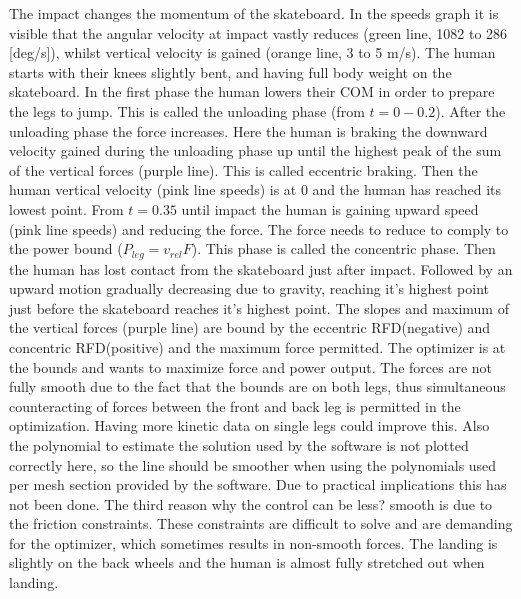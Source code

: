 \documentclass[default,iicol]{sn-jnl}
\begin{document}
{The impact changes the momentum of the skateboard. In the speeds graph it is visible that the angular velocity at impact vastly reduces (green line, 1082 to 286 [deg/s]), whilst vertical velocity is gained (orange line, 3 to 5 m/s).
The human starts with their knees slightly bent, and having full body weight on the skateboard. In the first phase the human lowers their COM in order to prepare the legs to jump. This is called the unloading phase (from $t=0 - 0.2$). After the unloading phase the force increases. Here the human is braking the downward velocity gained during the unloading phase up until the highest peak of the sum of the vertical forces (purple line). This is called eccentric braking. Then the human vertical velocity (pink line speeds) is at 0 and the human has reached its lowest point. From $t=0.35$ until impact the human is gaining upward speed  (pink line speeds) and reducing the force. The force needs to reduce to comply to the power bound ($P_{leg} = v_{rel} F$). This phase is called the concentric phase. Then the human has lost contact from the skateboard just after impact. Followed by an upward motion gradually decreasing due to gravity, reaching it's highest point just before the skateboard reaches it's highest point. The slopes and maximum of the vertical forces (purple line) are bound by the eccentric RFD(negative) and concentric RFD(positive) and the maximum force permitted. The optimizer is at the bounds and wants to maximize force and power output. The forces are not fully smooth due to the fact that the bounds are on both legs, thus simultaneous counteracting of forces between the front and back leg is permitted in the optimization. Having more kinetic data on single legs could improve this. Also the polynomial to estimate the solution used by the software is not plotted correctly here, so the line should be smoother when using the polynomials used per mesh section provided by the software. Due to practical implications this has not been done. The third reason why the control can be less? smooth is due to the friction constraints. These constraints are difficult to solve and are demanding for the optimizer, which sometimes results in non-smooth forces.
The landing is slightly on the back wheels and the human is almost fully stretched out when landing.

}
\end{document}
